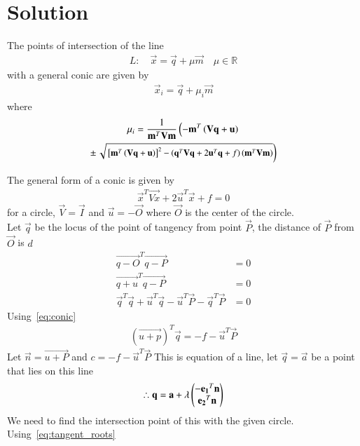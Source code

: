 \documentclass[journal,12pt,twocolumn]{IEEEtran}
\begin{document}
\section{Solution}
\begin{theorem}
  The points of intersection of the line 
\begin{align}
L: \quad \vec{x} = \vec{q} + \mu \vec{m} \quad \mu \in \mathbb{R}
\label{eq:conic_tangent}
\end{align}
with a general conic are given by
\begin{align}
\vec{x}_i = \vec{q} + \mu_i \vec{m}
\end{align}
%
where
\begin{multline}
\mu_i = \frac{1}
{
\mathbf{m}^T\mathbf{V}\mathbf{m}
}
\left(-\mathbf{m}^T\left(\mathbf{V}\mathbf{q}+\mathbf{u}\right)\right.
\\
\pm
{\small
\ensuremath{\left.\sqrt{
{}\left[
\mathbf{m}^T\left(\mathbf{V}\mathbf{q}+\mathbf{u}\right)
\right]^2
-
\left(
\mathbf{q}^T\mathbf{V}\mathbf{q} + 2\mathbf{u}^T\mathbf{q} +f
\right)
\left(\mathbf{m}^T\mathbf{V}\mathbf{m}\right)
}
\right)}
}
\label{eq:tangent_roots}
\end{multline}
\end{theorem}
The general form of a conic is given by
\begin{align}
  \vec{x}^T\vec{Vx}+2\vec{u}^T\vec{x}+f=0 \label{eq:conic}
\end{align}
for a circle, $\vec{V}=\vec{I}$ and $\vec{u}=-\vec{O}$ where $\vec{O}$ is the center of the circle.\\
Let $\vec{q}$ be the locus of the point of tangency from point $\vec{P}$, the distance of $\vec{P}$ from $\vec{O}$ is $d$ 
\begin{align}
  \vec{q-O}^T\vec{q-P}&=0\\
  \vec{q+u}^T\vec{q-P}&=0\\
  \vec{q}^T\vec{q}+\vec{u}^T\vec{q}-\vec{u}^T\vec{P}-\vec{q}^T\vec{P}&=0
\end{align} 
Using~\eqref{eq:conic}
\begin{align}
  (\vec{u+p})^T\vec{q}=-f-\vec{u}^T\vec{P}
\end{align}
Let $\vec{n}=\vec{u+P}$ and $c=-f-\vec{u}^T\vec{P}$
This is equation of a line, let $\vec{q}=\vec{a}$ be a point that lies on this line
\begin{align}
  \therefore \mathbf{q}=\mathbf{a}+\lambda\begin{pmatrix}-\mathbf{e_1}^T\mathbf{n}\\\mathbf{e_2}^T\mathbf{n}\end{pmatrix}
\end{align}
We need to find the intersection point of this with the given circle.\\
Using~\eqref{eq:tangent_roots}
\end{document}
